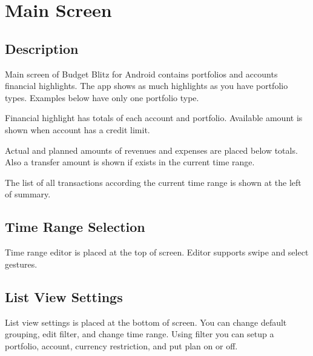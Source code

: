\documentclass[a4paper,10pt,english]{sphinxmanual}
\begin{document}
\chapter{Main Screen}
\label{\detokenize{main-screen:main-screen}}\label{\detokenize{main-screen:chapter-main-screen}}\label{\detokenize{main-screen::doc}}

\section{Description}
\label{\detokenize{main-screen:description}}
Main screen of Budget Blitz for Android contains portfolios and accounts financial highlights. The app shows
as much highlights as you have portfolio types. Examples below have only one  portfolio type.

Financial highlight has totals of each account and portfolio. Available amount is shown when account
has a credit limit.

Actual and planned amounts of revenues and expenses are placed below totals. Also a transfer amount is shown
if exists in the current time range.

\noindent{}
\noindent{}
\noindent{}

The list of all transactions according the current time range is shown at the left of summary.


\section{Time Range Selection}
\label{\detokenize{main-screen:time-range-selection}}
Time range editor is placed at the top of screen. Editor supports swipe and select gestures.

\noindent{}
\noindent{}
\noindent{}


\section{List View Settings}
\label{\detokenize{main-screen:list-view-settings}}
List view settings is placed at the bottom of screen. You can change default grouping,
edit filter, and change time range. Using filter you can setup a portfolio, account,
currency restriction, and put plan on or off.
\end{document}
